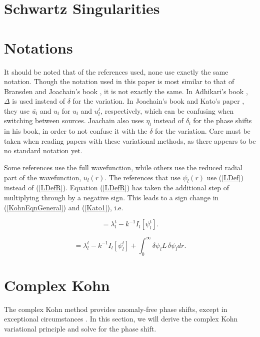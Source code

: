 \documentclass[Dissertation.tex]{subfiles}
\begin{document}
\section{Schwartz Singularities}
\label{sec:SchwartzSing}


\section{Notations}
It should be noted that of the references used, none use exactly the same notation.  Though the notation used in this paper is most similar to that of Bransden and Joachain's book \cite{Bransden2003}, it is not exactly the same.  In Adhikari's book \cite{Adhikari}, $\Delta$ is used instead of $\delta$ for the variation.  In Joachain's book \cite{Joachain1979} and Kato's paper \cite{Kato1951a}, they use $\overline{u_l}$ and $u_l$ for $u_l$ and $u_l^t$, respectively, which can be confusing when switching between sources.  Joachain also uses $\eta_l$ instead of $\delta_l$ for the phase shifts in his book, in order to not confuse it with the $\delta$ for the variation.  Care must be taken when reading papers with these variational methods, as there appears to be no standard notation yet.

Some references use the full wavefunction, while others use the reduced radial part of the wavefunction, $u_l(r)$.  The references that use $\psi_l(r)$ use (\ref{LDef}) instead of (\ref{LDefR}).  Equation (\ref{LDefR}) has taken the additional step of multiplying through by a negative sign.  This leads to a sign change in (\ref{KohnEqnGeneral}) and (\ref{Kato1}), i.e.

\begin{equation}
[\lambda_l] = \lambda_l^t - k^{-1} I_l[\psi_l^t].
\label{KohnEqnGeneralPsi}
\end{equation}

\begin{equation}
[\lambda_l] = \lambda_l^t - k^{-1} I_l[\psi_l^t] + \int_0^\infty \delta \psi_l L \, \delta \psi_l dr.
\label{Kato1Psi}
\end{equation}




\section{Complex Kohn}

The complex Kohn method provides anomaly-free phase shifts, except in exceptional circumstances \cite{Lucchese1989}.  In this section, we will derive the complex Kohn variational principle and solve for the phase shift.
\end{document}
